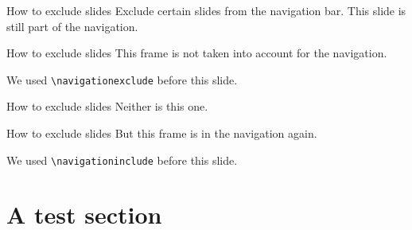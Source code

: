 \documentclass[aspectratio=169]{beamer}
\begin{document}
\begin{frame}{How to exclude slides}
	Exclude certain slides from the navigation bar. This slide is still part of the navigation.
\end{frame}

\navigationexclude
\begin{frame}{How to exclude slides}
	This frame is not taken into account for the navigation.
	
	We used \texttt{\textbackslash navigationexclude} before this slide.
\end{frame}

\begin{frame}{How to exclude slides}
	Neither is this one.
\end{frame}

\navigationinclude
\begin{frame}{How to exclude slides}
	But this frame is in the navigation again.
	
	We used \texttt{\textbackslash navigationinclude} before this slide.
\end{frame}


\begin{frame}
	\lipsum[2]
\end{frame}

\section{A test section}
\rptusectionpage
\begin{frame}
	\lipsum[5]
\end{frame}

\begin{frame}
	\lipsum[6]
\end{frame}


\rptuthankyou %
\end{document}

